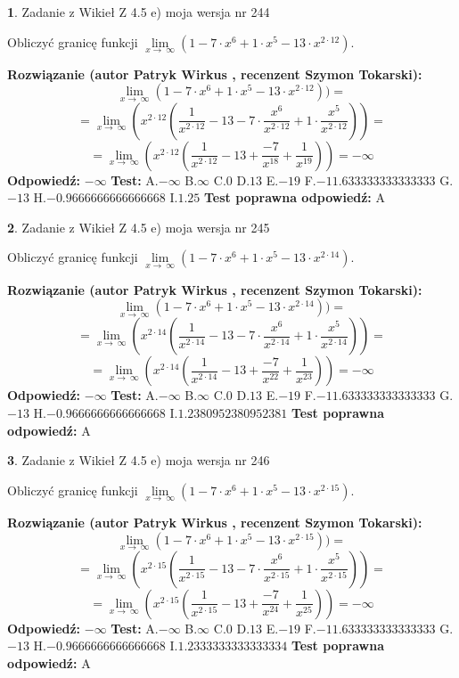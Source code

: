 \documentclass[12pt, a4paper]{article}
\theoremstyle{definition} %
\newtheorem{zad}{}
\newcommand{\zadStart}[1]{\begin{zad}#1\newline}
\newcommand{\zadStop}{\end{zad}}
\newcommand{\rozwStart}[2]{\noindent \textbf{Rozwiązanie (autor #1 , recenzent #2): }\newline}
\newcommand{\rozwStop}{\newline}
\newcommand{\odpStart}{\noindent \textbf{Odpowiedź:}\newline}
\newcommand{\odpStop}{\newline}
\newcommand{\testStart}{\noindent \textbf{Test:}\newline}
\newcommand{\testStop}{\newline}
\newcommand{\kluczStart}{\noindent \textbf{Test poprawna odpowiedź:}\newline}
\newcommand{\kluczStop}{\newline}
\begin{document}
\zadStart{Zadanie z Wikieł Z 4.5 e) moja wersja nr 244}


Obliczyć granicę funkcji  $\lim\limits_{x\to\ \infty}(1 - 7 \cdot x^{6}+1 \cdot x^{5}- 13 \cdot x^{2\cdot12})$.
\zadStop
\rozwStart{Patryk Wirkus}{Szymon Tokarski}
$$\lim\limits_{x\to\ \infty}(1 - 7 \cdot x^{6}+1 \cdot x^{5}- 13 \cdot x^{2\cdot12}))=$$
$$=\lim\limits_{x\to\ \infty}(x^{2\cdot12}(\frac{1}{x^{2\cdot12}}-13 -7 \cdot \frac{x^{6}}{x^{2\cdot12}}+1 \cdot \frac{x^{5}}{x^{2\cdot12}}))=$$
$$=\lim\limits_{x\to\ \infty}(x^{2\cdot12}(\frac{1}{x^{2\cdot12}}-13 + \frac{-7}{x^{18}}+ \frac{1}{x^{19}}))=-\infty$$
\rozwStop
\odpStart
$-\infty$
\odpStop
\testStart
A.$-\infty$ B.$\infty$ C.$0$ D.$13$ E.$-19$
F.$-11.633333333333333$ G.$-13$
H.$-0.9666666666666668$
I.$1.25$
\testStop
\kluczStart
A
\kluczStop



\zadStart{Zadanie z Wikieł Z 4.5 e) moja wersja nr 245}


Obliczyć granicę funkcji  $\lim\limits_{x\to\ \infty}(1 - 7 \cdot x^{6}+1 \cdot x^{5}- 13 \cdot x^{2\cdot14})$.
\zadStop
\rozwStart{Patryk Wirkus}{Szymon Tokarski}
$$\lim\limits_{x\to\ \infty}(1 - 7 \cdot x^{6}+1 \cdot x^{5}- 13 \cdot x^{2\cdot14}))=$$
$$=\lim\limits_{x\to\ \infty}(x^{2\cdot14}(\frac{1}{x^{2\cdot14}}-13 -7 \cdot \frac{x^{6}}{x^{2\cdot14}}+1 \cdot \frac{x^{5}}{x^{2\cdot14}}))=$$
$$=\lim\limits_{x\to\ \infty}(x^{2\cdot14}(\frac{1}{x^{2\cdot14}}-13 + \frac{-7}{x^{22}}+ \frac{1}{x^{23}}))=-\infty$$
\rozwStop
\odpStart
$-\infty$
\odpStop
\testStart
A.$-\infty$ B.$\infty$ C.$0$ D.$13$ E.$-19$
F.$-11.633333333333333$ G.$-13$
H.$-0.9666666666666668$
I.$1.2380952380952381$
\testStop
\kluczStart
A
\kluczStop



\zadStart{Zadanie z Wikieł Z 4.5 e) moja wersja nr 246}


Obliczyć granicę funkcji  $\lim\limits_{x\to\ \infty}(1 - 7 \cdot x^{6}+1 \cdot x^{5}- 13 \cdot x^{2\cdot15})$.
\zadStop
\rozwStart{Patryk Wirkus}{Szymon Tokarski}
$$\lim\limits_{x\to\ \infty}(1 - 7 \cdot x^{6}+1 \cdot x^{5}- 13 \cdot x^{2\cdot15}))=$$
$$=\lim\limits_{x\to\ \infty}(x^{2\cdot15}(\frac{1}{x^{2\cdot15}}-13 -7 \cdot \frac{x^{6}}{x^{2\cdot15}}+1 \cdot \frac{x^{5}}{x^{2\cdot15}}))=$$
$$=\lim\limits_{x\to\ \infty}(x^{2\cdot15}(\frac{1}{x^{2\cdot15}}-13 + \frac{-7}{x^{24}}+ \frac{1}{x^{25}}))=-\infty$$
\rozwStop
\odpStart
$-\infty$
\odpStop
\testStart
A.$-\infty$ B.$\infty$ C.$0$ D.$13$ E.$-19$
F.$-11.633333333333333$ G.$-13$
H.$-0.9666666666666668$
I.$1.2333333333333334$
\testStop
\kluczStart
A
\kluczStop
\end{document}
